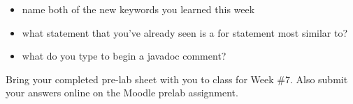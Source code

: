 \begin{exer}

\begin{itemize}

\item name both of the new keywords you learned this week

  \evalline
  
\item what statement that you've already seen is a for statement most similar to?

  \evalline
  
\item what do you type to begin a javadoc comment?

  \evalline
  
\end{itemize}

\end{exer}

Bring your completed pre-lab sheet with you to class for Week \#7. Also submit your answers online on the Moodle prelab assignment.  

